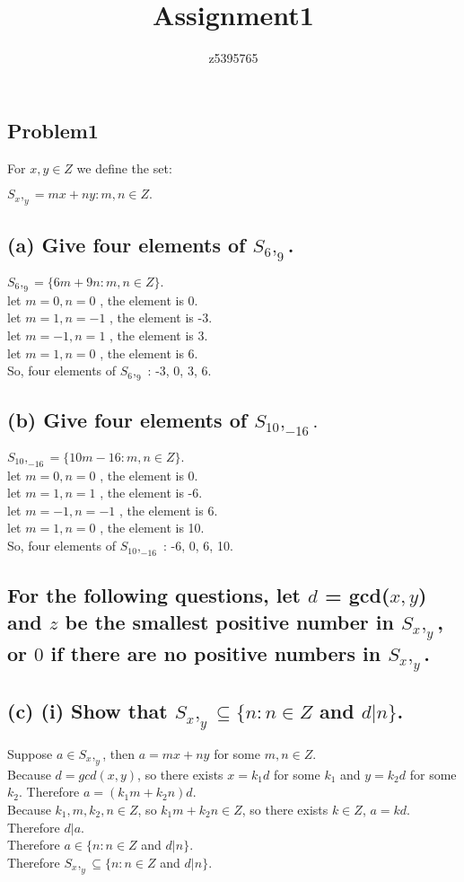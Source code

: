 \documentclass[]{article}
\title{Assignment1}
\author{z5395765}
\begin{document}
\maketitle
\begin{spacing}{1.5}
	

\section*{Problem1}

For $x, y \in Z$ we define the set:
\begin{center}
$ S_{x}, _ {y}  = {mx + ny : m, n \in Z} .$\\
\end{center}
\subsection*{(a) Give four elements of $S_6,_9$.}
$ S_6,_9 = \{ 6m+9n: m,n \in Z \}. $\\
let $ m = 0, n = 0 $ , the element is 0.\\
let $ m = 1, n = -1 $ , the element is -3.\\
let $ m = -1, n = 1 $ , the element is 3.\\
let $ m = 1, n = 0 $ , the element is 6.\\
So, four elements of $ S_6,_9 $ : -3, 0, 3, 6.
\subsection*{(b) Give four elements of $ S_{10},_{-16}. $}
$ S_{10},_{-16} = \{ 10m-16: m,n \in Z \}. $\\
let $ m = 0, n = 0 $ , the element is 0.\\
let $ m = 1, n = 1 $ , the element is -6.\\
let $ m = -1, n = -1 $ , the element is 6.\\
let $ m = 1, n = 0 $ , the element is 10. \\
So, four elements of $ S_{10},_{-16} $ : -6, 0, 6, 10. 
\subsection*{For the following questions, let $ d $ = gcd($ x, y $) and $ z $ be the smallest positive number in $ S_{x}, _ {y} $, or $ 0 $ if there are no positive numbers in $ S_{x}, _ {y} $.}
\subsection*{(c)  (i)  Show that $  S_{x},_{y} \subseteq \{n : n \in Z$ and  $d | n\} $.}
Suppose $ a \in  S_{x},_{y} $, then $ a = mx+ny$ for some $m,n \in Z .$\\
Because $ d = gcd(x,y) $, so there exists $ x = k_1d $ for some $ k_1 $ and $ y = k_2d $ for some $ k_2 $. Therefore $ a = (k_1m + k_2n)d $.\\
Because $ k_1, m, k_2, n \in Z$, so $ k_1m + k_2n  \in Z$, so there exists $ k \in Z $, $ a = kd $. Therefore $ d | a $.\\
Therefore $ a \in \{n : n \in Z$ and  $d | n\} $.\\
Therefore $  S_{x},_{y} \subseteq \{n : n \in Z$ and  $d | n\} $.

\end{spacing}
\end{document}
